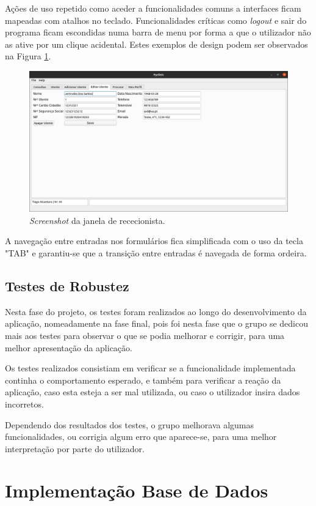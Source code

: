 \documentclass[11pt,a4paper,twoside]{report}
\begin{document}
	Ações de uso repetido como aceder a funcionalidades comuns a interfaces ficam mapeadas com atalhos no teclado.
	Funcionalidades críticas como \textit{logout} e sair do programa ficam escondidas numa barra de menu por forma a que o utilizador não as ative por um clique acidental.
	Estes exemplos de design podem ser observados na Figura \ref{fig:PyClinic_edit}.
	
	\begin{figure}[H]
		\centering
		\includegraphics[width=0.8\linewidth]{image/PyClinic_edit}
		\caption{\textit{Screenshot} da janela de rececionista.}
		\label{fig:PyClinic_edit}
	\end{figure}
	
	A navegação entre entradas nos formulários fica simplificada com o uso da tecla "TAB" e garantiu-se que a transição entre entradas é navegada de forma ordeira.
	

\section{Testes de Robustez}
	Nesta fase do projeto, os testes foram realizados ao longo do desenvolvimento da aplicação, nomeadamente na fase final, pois foi nesta fase que o grupo se dedicou mais aos testes para observar o que se podia melhorar e corrigir, para uma melhor apresentação da aplicação.
	
	Os testes realizados consistiam em verificar se a funcionalidade implementada continha o comportamento esperado, e também para verificar a reação da aplicação, caso esta esteja a ser mal utilizada, ou caso o utilizador insira dados incorretos. 
	
	Dependendo dos resultados dos testes, o grupo melhorava algumas funcionalidades, ou corrigia algum erro que aparece-se, para uma melhor interpretação por parte do utilizador.

	 
\chapter{Implementação Base de Dados}
\end{document}
